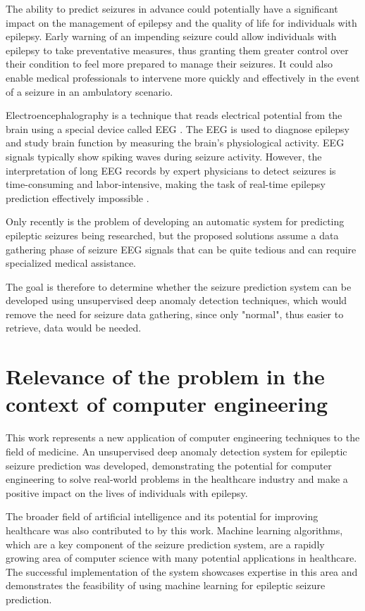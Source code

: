 The ability to predict seizures in advance could potentially have a significant impact on the management of epilepsy and the quality of life for individuals with epilepsy. Early warning of an impending seizure could allow individuals with epilepsy to take preventative measures, thus granting them greater control over their condition to feel more prepared to manage their seizures. 
It could also enable medical professionals to intervene more quickly and effectively in the event of a seizure in an ambulatory scenario.

Electroencephalography is a technique that reads electrical potential from the brain using a special device called \gls{EEG} \cite{kumar_analysis_2012}. The \gls{EEG} is used to diagnose epilepsy and study brain function by measuring the brain's physiological activity. \gls{EEG} signals typically show spiking waves during seizure activity. However, the interpretation of long \gls{EEG} records by expert physicians to detect seizures is time-consuming and labor-intensive, making the task of real-time epilepsy prediction effectively impossible \cite{siuly_eeg_2016}.

Only recently is the problem of developing an automatic system for predicting epileptic seizures being researched, but the proposed solutions assume a data gathering phase of seizure \gls{EEG} signals that can be quite tedious and can require specialized medical assistance.

The goal is therefore to determine whether the seizure prediction system can be developed using unsupervised deep anomaly detection techniques, which would remove the need for seizure data gathering, since only "normal", thus easier to retrieve, data would be needed.

\section{Relevance of the problem in the context of computer engineering}

This work represents a new application of computer engineering techniques to the field of medicine. An unsupervised deep anomaly detection system for epileptic seizure prediction was developed, demonstrating the potential for computer engineering to solve real-world problems in the healthcare industry and make a positive impact on the lives of individuals with epilepsy.

The broader field of artificial intelligence and its potential for improving healthcare was also contributed to by this work. Machine learning algorithms, which are a key component of the seizure prediction system, are a rapidly growing area of computer science with many potential applications in healthcare. The successful implementation of the system showcases expertise in this area and demonstrates the feasibility of using machine learning for epileptic seizure prediction.

